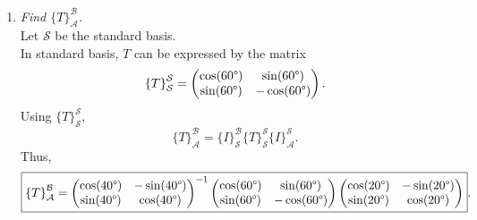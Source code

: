 \documentclass[12pt]{article}
\newcommand{\based}[3]{{\{#1\}}_{#2}^{#3}}
\begin{document}
\begin{enumerate}[label=(\alph*)]
	\item \textit{Find $\based{T}{\mathcal{A}}{\mathcal{B}}$.}
	\\[\baselineskip]
	Let $\mathcal{S}$ be the standard basis. \\
	In standard basis, $T$ can be expressed by the matrix
	\begin{equation*}
		\based{T}{\mathcal{S}}{\mathcal{S}}
		=
		\begin{pmatrix}
			\cos(60 \degree) & \sin(60 \degree) \\
			\sin(60 \degree) & -\cos(60 \degree)
		\end{pmatrix}
		.
	\end{equation*}
	Using $\based{T}{\mathcal{S}}{\mathcal{S}}$,
	\begin{equation*}
		\based{T}{\mathcal{A}}{\mathcal{B}}
		=
		\based{I}{\mathcal{S}}{\mathcal{B}}
		\based{T}{\mathcal{S}}{\mathcal{S}}
		\based{I}{\mathcal{A}}{\mathcal{S}}
		.
	\end{equation*}
	Thus,
	\footnotesize
	\begin{equation*}
		\boxed{
			\based{T}{\mathcal{A}}{\mathcal{B}}
			=
			\begin{pmatrix}
				\cos(40 \degree) & -\sin(40 \degree) \\
				\sin(40 \degree) & \cos(40 \degree)
			\end{pmatrix}
			^{-1}
			\begin{pmatrix}
				\cos(60 \degree) & \sin(60 \degree) \\
				\sin(60 \degree) & -\cos(60 \degree)
			\end{pmatrix}
			\begin{pmatrix}
				\cos(20 \degree) & -\sin(20 \degree) \\
				\sin(20 \degree) & \cos(20 \degree)
			\end{pmatrix}
		}
		.
	\end{equation*}
	\normalsize
	

\end{enumerate}
\end{document}

